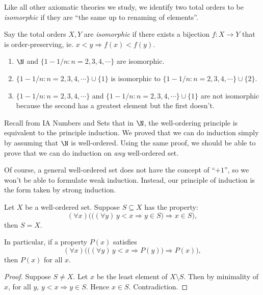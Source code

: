 \documentclass[a4paper]{article}
\begin{document}
Like all other axiomatic theories we study, we identify two total orders to be \emph{isomorphic} if they are ``the same up to renaming of elements''.
\begin{defi}
  Say the total orders $X, Y$ are \emph{isomorphic} if there exists a bijection $f: X\to Y$ that is order-preserving, ie. $x < y \Rightarrow f(x) < f(y)$.
\end{defi}

\begin{eg}\leavevmode
\begin{enumerate}
  \item $\N$ and $\{1 - 1/n: n = 2, 3, 4, \cdots\}$ are isomorphic.
  \item $\{1 - 1/n:n = 2, 3, 4, \cdots\}\cup \{1\}$ is isomorphic to $\{1 - 1/n: n = 2, 3, 4, \cdots\} \cup \{2\}$.
  \item $\{1 - 1/n: n = 2, 3, 4, \cdots\}$ and $\{1 - 1/n: n = 2, 3, 4, \cdots\}\cup \{1\}$ are not isomorphic because the second has a greatest element but the first doesn't.
\end{enumerate}
\end{eg}

Recall from IA Numbers and Sets that in $\N$, the well-ordering principle is equivalent to the principle induction. We proved that we can do induction simply by assuming that $\N$ is well-ordered. Using the same proof, we should be able to prove that we can do induction on \emph{any} well-ordered set.

Of course, a general well-ordered set does not have the concept of ``$+1$'', so we won't be able to formulate weak induction. Instead, our principle of induction is the form taken by strong induction.
\begin{prop}
  Let $X$ be a well-ordered set. Suppose $S \subseteq X$ has the property:
  \[
    (\forall x)\Big(\big((\forall y)\, y < x \Rightarrow y\in S\big) \Rightarrow x\in S\Big),
  \]
  then $S = X$.

  In particular, if a property $P(x)$ satisfies
  \[
    (\forall x)\Big(\big((\forall y)\, y < x \Rightarrow P(y)\big)\Rightarrow P(x)\Big),
  \]
  then $P(x)$ for all $x$.
\end{prop}

\begin{proof}
  Suppose $S\not=X$. Let $x$ be the least element of $X\setminus S$. Then by minimality of $x$, for all $y$, $y < x \Rightarrow y\in S$. Hence $x\in S$. Contradiction.
\end{proof}
\end{document}
